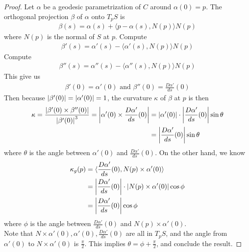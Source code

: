 \documentclass{report}
\begin{document}
\begin{proof}
Let $\alpha $ be a geodesic parametrization of $C$ around $\alpha (0)=p$. The orthogonal projection $\beta $ of $\alpha $ onto $T_pS$ is 
\begin{align*}
\beta (s)=\alpha (s)+ \langle p-\alpha (s),N(p)\rangle N(p)
\end{align*}
where $N(p)$ is the normal of $S$ at  $p$. Compute 
\begin{align*}
\beta '(s)=\alpha '(s)- \langle \alpha '(s),N(p)\rangle N(p)
\end{align*}
Compute 
\begin{align*}
\beta ''(s)=\alpha ''(s)- \langle \alpha ''(s),N(p)\rangle N(p)
\end{align*}
This give us
\begin{align*}
\beta '(0)= \alpha '(0)\text{ and }\beta ''(0)= \frac{D\alpha '}{ds}(0)
\end{align*}
Then because $\left|\beta '(0)\right|=\left|\alpha '(0)\right|=1$, the curvature $\kappa$ of $\beta $ at $p$ is then 
\begin{align*}
  \kappa= \frac{\left|\beta '(0)\times \beta ''(0)\right|}{\left|\beta '(0)\right|^3}= \left|\alpha '(0)\times \frac{D\alpha '}{ds}(0) \right|&= \left|\alpha '(0)\right|\cdot \left|\frac{D\alpha '}{ds}(0)\right| \sin \theta\\
&=\left|\frac{D\alpha '}{ds}(0)\right|\sin \theta
\end{align*}
where $\theta$ is the angle between $\alpha '(0)$ and $\frac{D\alpha '}{ds}(0)$. On the other hand, we know 
\begin{align*}
\kappa_g(p)&= \langle \frac{D\alpha '}{ds}(0), N(p)\times \alpha '(0) \rangle \\
&=\left|\frac{D\alpha '}{ds}(0)\right|\cdot \left|N(p)\times \alpha '(0)\right|\cos \phi\\
&=\left|\frac{D\alpha '}{ds}(0)\right|\cos \phi
\end{align*}
where $\phi$ is the angle between $\frac{D\alpha '}{ds}(0)$ and $N(p)\times \alpha '(0)$.\\

Note that $N\times \alpha '(0),\alpha '(0), \frac{D\alpha '}{ds}(0)$ are all in $T_pS$, and the angle from $\alpha '(0)$ to $N\times \alpha '(0)$ is $\frac{\pi}{2}$. This implies $\theta = \phi + \frac{\pi}{2}$, and conclude the result. 
\end{proof}
\end{document}
